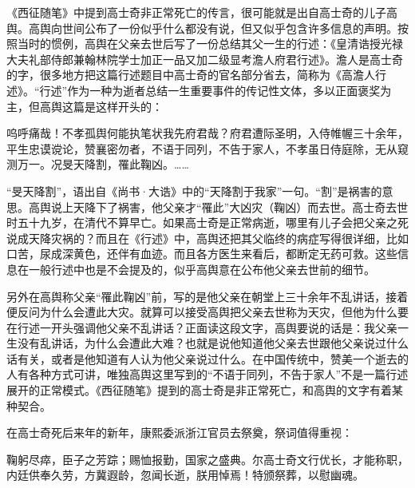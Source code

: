 
《西征随笔》中提到高士奇非正常死亡的传言，很可能就是出自高士奇的儿子高舆。高舆向世间公布了一份似乎什么都没有说，但又似乎包含许多信息的声明。按照当时的惯例，高舆在父亲去世后写了一份总结其父一生的行述：《皇清诰授光禄大夫礼部侍郎兼翰林院学士加正一品又加二级显考澹人府君行述》。澹人是高士奇的字，很多地方把这篇行述题目中高士奇的官名部分省去，简称为《高澹人行述》。“行述”作为一种为逝者总结一生重要事件的传记性文体，多以正面褒奖为主，但高舆这篇是这样开头的：



\begin{bookquote}呜呼痛哉！不孝孤舆何能执笔状我先府君哉？府君遭际圣明，入侍帷幄三十余年，平生忠谟谠论，赞襄密勿者，不语于同列，不告于家人，不孝虽日侍庭除，无从窥测万一。况旻天降割，罹此鞠凶。……\end{bookquote}


“旻天降割”，语出自《尚书·大诰》中的“天降割于我家”一句。“割”是祸害的意思。高舆说上天降下了祸害，他父亲才“罹此”大凶灾（鞠凶）而去世。高士奇去世时五十九岁，在清代不算早亡。如果高士奇是正常病逝，哪里有儿子会把父亲之死说成天降灾祸的？而且在《行述》中，高舆还把其父临终的病症写得很详细，比如口苦，尿成深黄色，还伴有血迹。而且各方医生来看后，都断定无药可救。这些信息在一般行述中也是不会提及的，似乎高舆意在公布他父亲去世前的细节。



另外在高舆称父亲“罹此鞠凶”前，写的是他父亲在朝堂上三十余年不乱讲话，接着便反问为什么会遭此大灾。就算可以接受高舆把父亲去世称为天灾，但他为什么要在行述一开头强调他父亲不乱讲话？正面读这段文字，高舆要说的话是：我父亲一生没有乱讲话，为什么会遭此大难？也就是说他知道他父亲去世跟他父亲说过什么话有关，或者是他知道有人认为他父亲说过什么。在中国传统中，赞美一个逝去的人有各种方式可讲，唯独高舆这里写到的“不语于同列，不告于家人”不是一篇行述展开的正常模式。《西征随笔》提到的高士奇是非正常死亡，和高舆的文字有着某种契合。



在高士奇死后来年的新年，康熙委派浙江官员去祭奠，祭词值得重视：



\begin{bookquote}鞠躬尽瘁，臣子之芳踪；赐恤报勤，国家之盛典。尔高士奇文行优长，才能称职，内廷供奉久劳，方冀遐龄，忽闻长逝，朕用悼焉！特颁祭葬，以慰幽魂。\end{bookquote}

